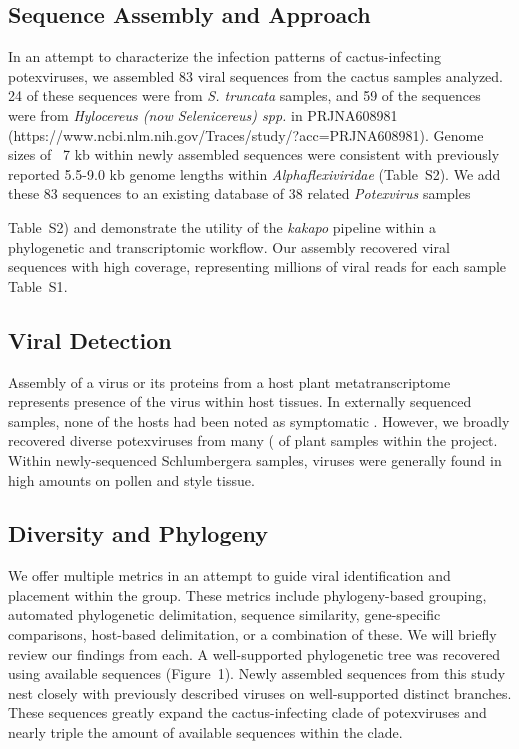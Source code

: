 \documentclass[fleqn,10pt,lineno]{wlpeerj}
\begin{document}
\subsection*{Sequence Assembly and Approach}
In an attempt to characterize the infection patterns of cactus-infecting potexviruses, we assembled 83 viral sequences from the cactus samples analyzed. 
24 of these sequences were from \textit{S. truncata} samples, and 59 of the sequences were from \textit{Hylocereus (now Selenicereus) spp.} in PRJNA608981 (https://www.ncbi.nlm.nih.gov/Traces/study/?acc=PRJNA608981)\citep{fan2020retracted}.
Genome sizes of ~7 kb within newly assembled sequences were consistent with previously reported 5.5-9.0 kb genome lengths within \textit{Alphaflexiviridae} \citep{kreuze_ictv_2020,ICTV_potexviruses}(Table~S2).
We add these 83 sequences to an existing database of 38 related \textit{Potexvirus} samples {Table~S2) and demonstrate the utility of the \textit{kakapo} pipeline within a phylogenetic and transcriptomic workflow. 
Our assembly recovered viral sequences with high coverage, representing millions of viral reads for each sample {Table~S1}.

 
\subsection*{Viral Detection}
Assembly of a virus or its proteins from a host plant metatranscriptome represents presence of the virus within host tissues. 
In externally sequenced samples, none of the hosts had been noted as symptomatic \citep{fan2020retracted}.
However, we broadly recovered diverse potexviruses from many (%
 of plant samples within the project.
 Within newly-sequenced Schlumbergera samples, viruses were generally found in high amounts on pollen and style tissue.


\subsection*{Diversity and Phylogeny}

We offer multiple metrics in an attempt to guide viral identification and placement within the group. 
These metrics include phylogeny-based grouping, automated phylogenetic delimitation, sequence similarity, gene-specific comparisons, host-based delimitation, or a combination of these. 
We will briefly review our findings from each.
A well-supported phylogenetic tree was recovered using available sequences (Figure~1).
Newly assembled sequences from this study nest closely with previously described viruses on well-supported distinct branches. 
These sequences greatly expand the cactus-infecting clade of potexviruses and nearly triple the amount of available sequences within the clade. 
}
\end{document}
